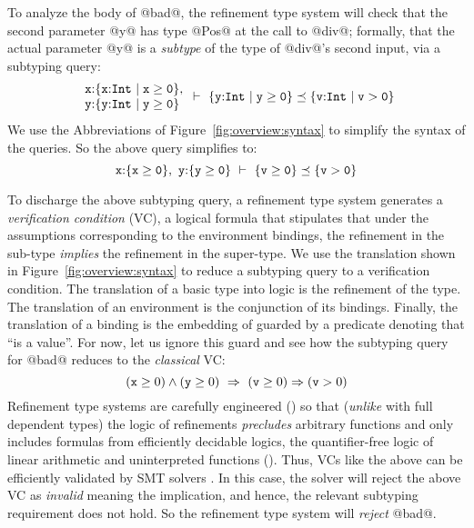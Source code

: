 To analyze the body of @bad@, the refinement type system will 
check that the second parameter @y@ has type @Pos@ at the call 
to @div@; formally, that %
the actual parameter @y@ is a \emph{subtype} of the type of 
@div@'s second input, via a subtyping query:
%
$$
\begin{array}{l}
\ttbind{x}{\tref{x}{Int}{}{x \geq 0}},\\ 
\ttbind{y}{\tref{y}{Int}{}{y \geq 0}}\\
\end{array}
 \vdash\ 
	\subt{\tttref{y}{Int}{}{y \geq 0}}{\tttref{v}{Int}{}{v > 0}}$$
%
We use the Abbreviations of Figure~\ref{fig:overview:syntax} to simplify the 
syntax of the queries.
%
So the above query simplifies to:
$$\ttbind{x}{\ttref{x \geq 0}},\ \ttbind{y}{\ttref{y \geq 0}}\ \vdash\ \subtref{v \geq 0}{v > 0}$$

To discharge the above subtyping query, a refinement type system
generates a \emph{verification condition} (VC), a logical formula 
that stipulates that under the assumptions corresponding to the 
environment bindings, the refinement in the sub-type \emph{implies} 
the refinement in the super-type.
%
We use the translation \embed{\cdot} shown in Figure~\ref{fig:overview:syntax}
to reduce a subtyping query to a verification condition.
%
The translation of a basic type into logic is the refinement of the type.
The translation of an environment is the conjunction of its bindings.
Finally, the translation of a binding \ttbind{\x}{\typ} is the embedding of \typ 
guarded by a predicate denoting that ``\x is a value''.
%
For now, let us ignore this guard and see how the subtyping query for 
@bad@ reduces to the \emph{classical} VC:
$$(\mathtt{x} \geq 0) \wedge (\mathtt{y} \geq 0)\ \Rightarrow\ (\mathtt{v} \geq 0) \Rightarrow (\mathtt{v} > 0)$$
Refinement type systems are carefully engineered () 
so that (\emph{unlike} with full dependent types) the logic of 
refinements \emph{precludes} arbitrary functions and only includes 
formulas from efficiently decidable logics, \eg the quantifier-free 
logic of linear arithmetic and uninterpreted functions (\logiclang).
Thus, VCs like the above can be efficiently validated by SMT 
solvers \cite{z3}. 
%
In this case, the solver will reject the above VC as \emph{invalid} meaning the 
implication, and hence, the relevant subtyping requirement does not hold.
So the refinement type system will \emph{reject} @bad@.

